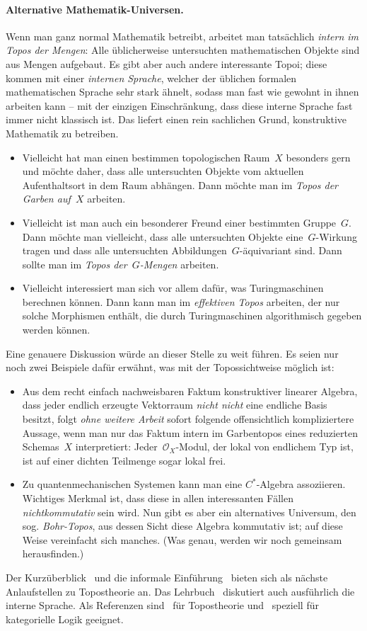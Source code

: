 \documentclass[a4paper,ngerman,12pt]{scrartcl}
\theoremstyle{definition}
\theoremstyle{plain}
\theoremstyle{remark}
\renewcommand{\O}{\mathcal{O}}
\renewcommand{\_}{\mathpunct{.}\,}
\newcommand{\?}{\,{:}\,}
\begin{document}
\paragraph{Alternative Mathematik-Universen.} Wenn man ganz normal Mathematik
betreibt, arbeitet man tatsächlich \emph{intern im Topos der Mengen}: Alle
üblicherweise untersuchten mathematischen Objekte sind aus Mengen aufgebaut. Es gibt
aber auch andere interessante Topoi; diese kommen mit einer \emph{internen
Sprache}, welcher der üblichen formalen mathematischen Sprache sehr stark
ähnelt, sodass man fast wie gewohnt in ihnen arbeiten kann -- mit der einzigen
Einschränkung, dass diese interne Sprache fast immer nicht klassisch ist. Das
liefert einen rein sachlichen Grund, konstruktive Mathematik zu betreiben.
\begin{itemize}
\item Vielleicht hat man einen bestimmen topologischen Raum~$X$ besonders gern
und möchte daher, dass alle untersuchten Objekte vom aktuellen Aufenthaltsort
in dem Raum abhängen. Dann möchte man im \emph{Topos der Garben auf~$X$}
arbeiten.
\item Vielleicht ist man auch ein besonderer Freund einer bestimmten
Gruppe~$G$. Dann möchte man vielleicht, dass alle untersuchten Objekte
eine~$G$-Wirkung tragen und dass alle untersuchten Abbildungen~$G$-äquivariant
sind. Dann sollte man im \emph{Topos der~$G$-Mengen} arbeiten.
\item Vielleicht interessiert man sich vor allem dafür, was Turingmaschinen
berechnen können. Dann kann man im \emph{effektiven Topos} arbeiten, der nur
solche Morphismen enthält, die durch Turingmaschinen algorithmisch gegeben
werden können.
\end{itemize}
Eine genauere Diskussion würde an dieser Stelle zu weit
führen. Es seien nur noch zwei Beispiele dafür erwähnt, was mit der Topossichtweise
möglich ist:
\begin{itemize}
\item Aus dem recht einfach nachweisbaren Faktum konstruktiver linearer
Algebra, dass jeder endlich erzeugte Vektorraum \emph{nicht nicht} eine endliche
Basis besitzt, folgt \emph{ohne weitere Arbeit} sofort folgende offensichtlich
kompliziertere Aussage, wenn man nur das Faktum intern im Garbentopos eines reduzierten
Schemas~$X$ interpretiert: Jeder~$\O_X$-Modul, der lokal von endlichem Typ ist,
ist auf einer dichten Teilmenge sogar lokal frei.
\item Zu quantenmechanischen Systemen kann man eine $C^*$-Algebra assoziieren.
Wichtiges Merkmal ist, dass diese in allen interessanten Fällen
\emph{nichtkommutativ} sein wird. Nun gibt es aber ein alternatives Universum,
den sog. \emph{Bohr-Topos}, aus dessen Sicht diese Algebra kommutativ ist; auf
diese Weise vereinfacht sich manches. (Was genau, werden wir noch gemeinsam
herausfinden.)
\end{itemize}
Der Kurzüberblick~\cite{baez:topos} und die informale
Einführung~\cite{leinster:topos} bieten sich als nächste Anlaufstellen zu
Topostheorie an.
Das Lehrbuch~\cite{moerdijk:maclane:sheaves} diskutiert auch ausführlich die
interne Sprache. Als Referenzen sind~\cite{johnstone:elephant} für Topostheorie
und~\cite{lambek:scott:hocatlogic} speziell für kategorielle Logik geeignet.
\end{document}
